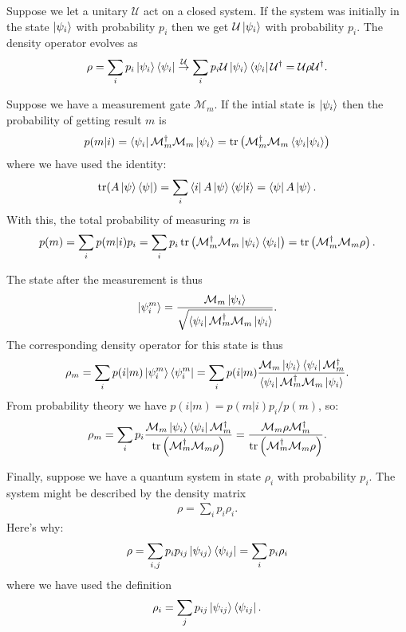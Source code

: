 \documentclass{book}
\theoremstyle{definition}
\newcommand{\M}{\mathcal{M}}
\newcommand{\f}[2]{\frac{#1}{#2}}
\newcommand{\lp}{\left(}
\newcommand{\rp}{\right)}
\newcommand{\U}{\mathcal{U}}
\begin{document}
Suppose we let a unitary $\U$ act on a closed system. If the system was initially in the state $\ket{\psi_i}$ with probability $p_i$ then we get $\U \ket{\psi_i}$ with probability $p_i$. The density operator evolves as
\begin{align}
\rho = \sum_i p_i \ket{\psi_i}\bra{\psi_i} \stackrel{\U}{\rightarrow} \sum_i p_i \U \ket{\psi_i}\bra{\psi_i}\U^\dagger = \U \rho \U^\dagger.
\end{align}


Suppose we have a measurement gate $\M_m$. If the intial state is $\ket{\psi_i}$ then the probability of getting result $m$ is 
\begin{align}
p(m\vert i) = \bra{\psi_i} \M_m^\dagger \M_m \ket{\psi_i} = \tr\lp \M_m^\dagger \M_m \braket{\psi_i} \rp
\end{align}
where we have used the identity:
\begin{align}
\tr(A\ket{\psi}\bra{\psi}) = \sum_i \bra{i}A \ket{\psi}\bra{\psi}\ket{i} = \bra{\psi}A\ket{\psi}.
\end{align}
With this, the total probability of measuring $m$ is 
\begin{align}
p(m) = \sum_i p(m|i)p_i = \sum_i p_i \tr\lp \M_m^\dagger \M_m \ket{\psi_i}\bra{\psi_i} \rp = \tr\lp \M_m^\dagger \M_m \rho \rp.
\end{align}

The state after the measurement is thus
\begin{align}
\ket{\psi_i^m} = \f{\M_m \ket{\psi_i}}{\sqrt{\bra{\psi_i}\M_m^\dagger \M_m \ket{\psi_i}}}.
\end{align}
The corresponding density operator for this state is thus
\begin{align}
\rho_m = \sum_i p(i|m)\ket{\psi_i^m}\bra{\psi_i^m} = \sum_i p(i|m)\f{\M_m \ket{\psi_i}\bra{\psi_i}\M_m^\dagger}{\bra{\psi_i}\M_m^\dagger \M_m \ket{\psi_i}}.
\end{align}
From probability theory we have $p(i|m) = p(m|i)p_i/p(m)$, so:
\begin{align}
\rho_m = \sum_i p_i \f{\M_m \ket{\psi_i}\bra{\psi_i}\M_m^\dagger}{\tr\lp \M^\dagger_m \M_m \rho \rp} = \f{\M_m \rho \M_m^\dagger}{\tr\lp \M_m^\dagger \M_m \rho \rp}.
\end{align}




Finally, suppose we have a quantum system in state $\rho_i$ with probability $p_i$. The system might be described by the density matrix
\begin{align}
\rho = \sum_i p_i \rho_i.
\end{align}
Here's why:
\begin{align}
\rho = \sum_{i,j}p_i p_{ij}\ket{\psi_{ij}}\bra{\psi_{ij}} = \sum_i p_i \rho_i
\end{align}
where we have used the definition
\begin{align}
\rho_i = \sum_{j}p_{ij}\ket{\psi_{ij}}\bra{\psi_{ij}}.
\end{align}
\end{document}
